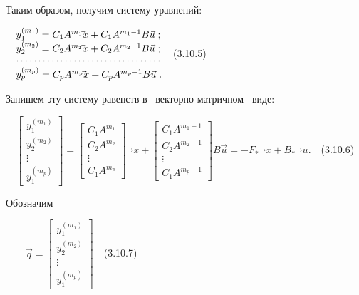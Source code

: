 \documentclass[a4paper]{article}
\begin{document}
{\begin{russian}\sffamily
Таким образом, получим систему уравнений:
\end{russian}}

{\begin{russian}\sffamily
\ \  $\begin{matrix}y_1^{(m_1)}=C_1A^{m_1}\vec{}x+C_1A^{m_1-1}B\vec u\;;\hfill\null
\\y_2^{(m_2)}=C_2A^{m_2}\vec{}x+C_2A^{m_2-1}B\vec u\;;\hfill\null \\\cdots \cdots \cdots \cdots \cdots \cdots \cdots
\cdots \cdots \cdots \cdots \hfill\null \\y_p^{(m_p)}=C_pA^{m_p}\vec{}x+C_pA^{m_p-1}B\vec u\;.\hfill\null
\end{matrix}\hfill $\ \ (3.10.5)
\end{russian}}

{\begin{russian}\sffamily
Запишем эту систему равенств в \ векторно-матричном \ виде:
\end{russian}}

{\begin{russian}\sffamily
\ \  $\left[\begin{matrix}y_1^{(m_1)}\\y_2^{(m_2)}\\\vdots
\\y_1^{(m_p)}\end{matrix}\right]=\left[\begin{matrix}C_1A^{m_1}\\C_2A^{m_2}\\\vdots
\\C_1A^{m_p}\end{matrix}\right]\vec{}x+\left[\begin{matrix}C_1A^{m_1-1}\\C_2A^{m_2-1}\\\vdots
\\C_1A^{m_p-1}\end{matrix}\right]B\vec u=-F_{\ast }\vec{}x+B_{\ast }\vec{}u$.\ \ (3.10.6)
\end{russian}}

{\begin{russian}\sffamily
Обозначим
\end{russian}}

{\begin{russian}\sffamily
\ \ \ \  $\vec q=\left[\begin{matrix}y_1^{(m_1)}\\y_2^{(m_2)}\\\vdots \\y_1^{(m_p)}\end{matrix}\right]$\ \ (3.10.7)
\end{russian}}
\end{document}
